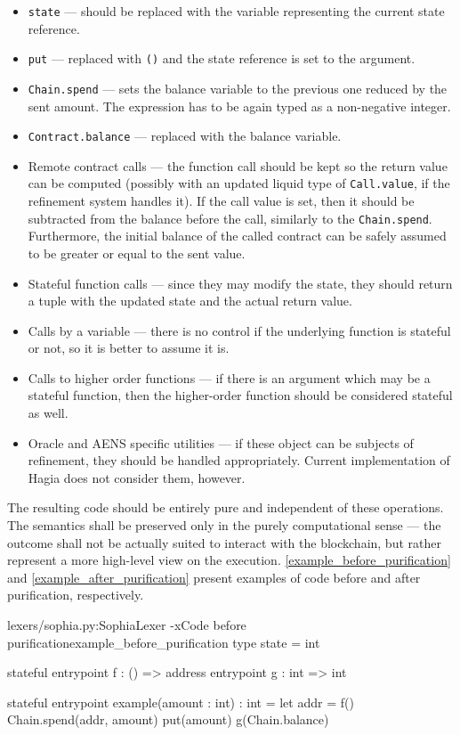 \begin{itemize}
\item \texttt{state} --- should be replaced with the variable representing the
  current state reference.
\item \texttt{put} --- replaced with \texttt{()} and the state reference is set
  to the argument.
\item \texttt{Chain.spend} --- sets the balance variable to the previous one
  reduced by the sent amount. The expression has to be again typed as a
  non-negative integer.
\item \texttt{Contract.balance} --- replaced with the balance variable.
\item Remote contract calls --- the function call should be kept so the return
  value can be computed (possibly with an updated liquid type of
  \texttt{Call.value}, if the refinement system handles it). If the call value
  is set, then it should be subtracted from the balance before the call,
  similarly to the \texttt{Chain.spend}. Furthermore, the initial balance of the
  called contract can be safely assumed to be greater or equal to the sent
  value.
\item Stateful function calls --- since they may modify the state, they should
  return a tuple with the updated state and the actual return value.
\item Calls by a variable --- there is no control if the underlying function is
  stateful or not, so it is better to assume it is.
\item Calls to higher order functions --- if there is an argument which may be a
  stateful function, then the higher-order function should be considered
  stateful as well.
\item Oracle and AENS specific utilities --- if these object can be subjects of
  refinement, they should be handled appropriately. Current implementation of
  Hagia does not consider them, however.
\end{itemize}


The resulting code should be entirely pure and independent of these operations.
The semantics shall be preserved only in the purely computational sense --- the
outcome shall not be actually suited to interact with the blockchain, but rather
represent a more high-level view on the execution.
\autoref{example_before_purification} and \autoref{example_after_purification}
present examples of code before and after purification, respectively.

\begin{code}[h]{lexers/sophia.py:SophiaLexer -x}{Code before purification}{example_before_purification}
type state = int

stateful entrypoint f : () => address
entrypoint g : int => int

stateful entrypoint example(amount : int) : int =
  let addr = f()
  Chain.spend(addr, amount)
  put(amount)
  g(Chain.balance)
\end{code}

